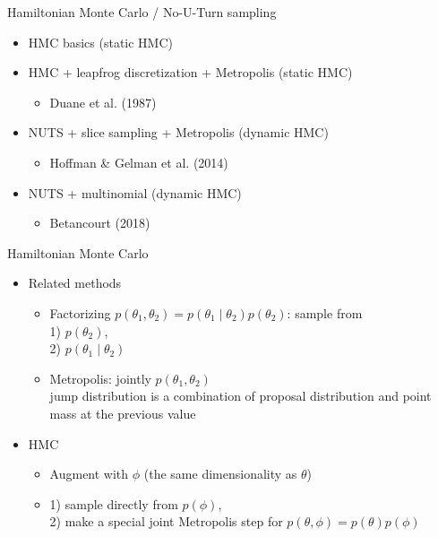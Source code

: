 \documentclass[finnish,english,t]{beamer}
\begin{document}
\begin{frame}{Hamiltonian Monte Carlo / No-U-Turn sampling}

  \begin{itemize}
  \item<+->[1.] HMC basics (static HMC)
  \item<+->[2.] HMC + leapfrog discretization + Metropolis (static HMC)
    \begin{itemize}
    \item Duane et al. (1987)
    \end{itemize}
  \item<+->[3.] NUTS + slice sampling + Metropolis (dynamic HMC)
    \begin{itemize}
    \item Hoffman \& Gelman et al. (2014)
    \end{itemize}
  \item<+->[4.] NUTS + multinomial (dynamic HMC)
    \begin{itemize}
    \item Betancourt (2018)
    \end{itemize}
  \end{itemize}

\end{frame}

\begin{frame}{Hamiltonian Monte Carlo}

  \begin{itemize}
  \item Related methods
    \begin{itemize}
    \item<+-> Factorizing $p(\theta_1,\theta_2)=p(\theta_1 \mid \theta_2)p(\theta_2)$: sample from\\
      1) $p(\theta_2)$,\\
      2) $p(\theta_1 \mid \theta_2)$
    \item<+-> Metropolis: jointly $p(\theta_1,\theta_2)$\\
      jump distribution is a combination of proposal distribution and
      point mass at the previous value
    \end{itemize}
  \item<+-> HMC
    \begin{itemize}
    \item Augment with $\phi$ (the same dimensionality as $\theta$)
    \item 1) sample directly from $p(\phi)$,\\
      2) make a special joint Metropolis step for $p(\theta,\phi)=p(\theta)p(\phi)$
    \end{itemize}
  \end{itemize}
  
\end{frame}
\end{document}
